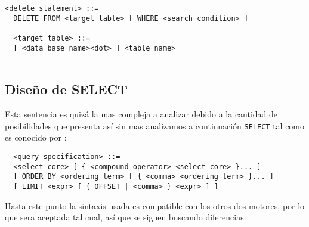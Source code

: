 \begin{Verbatim}[frame=single, label=sintaxis para DELETE]
  <delete statement> ::=
  DELETE FROM <target table> [ WHERE <search condition> ]
  
  <target table> ::=
  [ <data base name><dot> ] <table name>
  
\end{Verbatim}




\subsection{Diseño de SELECT}
Esta sentencia es quizá la mas compleja a analizar debido a la cantidad de posibilidades que presenta así sin mas analizamos a continuación \verb=SELECT= tal como es conocido por \s:

\begin{Verbatim}
  <query specification> ::=
  <select core> [ { <compound operator> <select core> }... ]
  [ ORDER BY <ordering term> [ { <comma> <ordering term> }... ]
  [ LIMIT <expr> [ { OFFSET | <comma> } <expr> ] ]  
\end{Verbatim}

Hasta este punto la sintaxis usada es compatible con los otros dos motores, por lo que sera aceptada tal cual, así que se siguen buscando diferencias:

